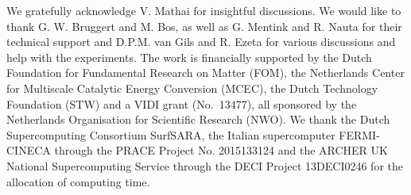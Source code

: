 \documentclass[aps,prl,superscriptaddress,preprint]{revtex4}
\newcommand{\blue}[1]{{\textcolor{blue}{#1}}}
\newcommand{\annotation}[1]{\blue{[\textit{#1}]}}
\begin{document}
%
%



%
 







\newpage




We gratefully acknowledge V. Mathai for insightful discussions. We would like to thank G. W. Bruggert and M. Bos, as well as G. Mentink and R. Nauta for their technical support and D.P.M. van Gils and R. Ezeta for various discussions and help with the experiments. The work is financially supported by the Dutch Foundation for
Fundamental Research on Matter (FOM), the Netherlands Center for Multiscale Catalytic
Energy Conversion (MCEC), the Dutch Technology Foundation (STW) and a VIDI grant (No.\ 13477), all sponsored by the Netherlands
Organisation for Scientific Research (NWO).  We thank the Dutch Supercomputing Consortium
SurfSARA, the Italian supercomputer FERMI-CINECA through the PRACE Project
No. 2015133124 and the ARCHER UK National Supercomputing Service through the DECI Project 13DECI0246 for the allocation of computing time.
\\
\end{document}
